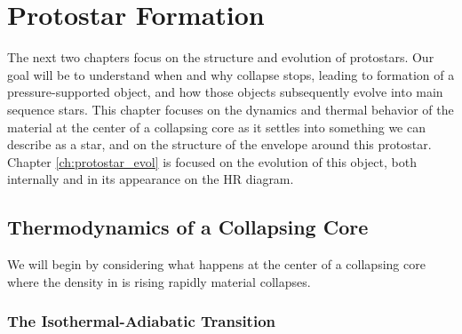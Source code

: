 \chapter{Protostar Formation}
\label{ch:protostar_form}


The next two chapters focus on the structure and evolution of protostars. Our goal will be to understand when and why collapse stops, leading to formation of a pressure-supported object, and how those objects subsequently evolve into main sequence stars. This chapter focuses on the dynamics and thermal behavior of the material at the center of a collapsing core as it settles into something we can describe as a star, and on the structure of the envelope around this protostar. Chapter \ref{ch:protostar_evol} is focused on the evolution of this object, both internally and in its appearance on the HR diagram. 

\section{Thermodynamics of a Collapsing Core}

We will begin by considering what happens at the center of a collapsing core where the density in is rising rapidly material collapses. 

\subsection{The Isothermal-Adiabatic Transition}
\label{ssec:iso_adiabat}

